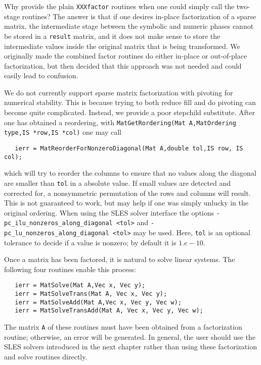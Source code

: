 {Why provide the plain {\tt XXXfactor} routines when one could simply 
call the two-stage routines? The answer is that if one desires in-place 
factorization of a sparse matrix, the intermediate stage between the 
symbolic and numeric phases cannot be stored in a {\tt result} matrix, and
it does not make sense to store the intermediate values
inside the original matrix 
that is being transformed.  We originally made the combined factor routines
do either in-place or out-of-place factorization, but then decided that 
this approach was not needed and could easily lead to confusion.

We do not currently support sparse matrix factorization with pivoting
for numerical stability. This is because trying to both reduce fill
and do pivoting can become quite complicated. Instead, we provide a 
poor stepchild substitute. After one has obtained a reordering, with
{\tt MatGetRordering(Mat A,MatOrdering type,IS *row,IS *col)} one
may call
\begin{verbatim}
   ierr = MatReorderForNonzeroDiagonal(Mat A,double tol,IS row, IS col);
\end{verbatim}
which will try to reorder the columns to ensure that no values along 
the diagonal are smaller than {\tt tol} in a absolute value. If small 
values are detected and corrected for, a nonsymmetric
permutation of the rows and columns will result. This is not guaranteed to work, 
but may help if one was simply unlucky in the original ordering.
 When using the SLES solver interface
the options {\tt -pc\_ilu\_nonzeros\_along\_diagonal <tol>} 
and 
{\tt -pc\_lu\_nonzeros\_along\_diagonal <tol>} may be used.  Here, {\tt tol}
is an optional tolerance to decide if a value is nonzero; by default it
is $ 1.e-10.$ 

Once a matrix has been factored, it is natural to solve linear systems.
The following four routines enable this process:  
\begin{verbatim}
   ierr = MatSolve(Mat A,Vec x, Vec y);
   ierr = MatSolveTrans(Mat A, Vec x, Vec y);
   ierr = MatSolveAdd(Mat A,Vec x, Vec y, Vec w);
   ierr = MatSolveTransAdd(Mat A, Vec x, Vec y, Vec w);
\end{verbatim}
The  
matrix 
{\tt A} of these routines must have been obtained from a 
factorization routine; otherwise, an error will be generated.
In general, the user should use the SLES solvers introduced in the 
next chapter rather than using these factorization and solve routines
directly.

}

